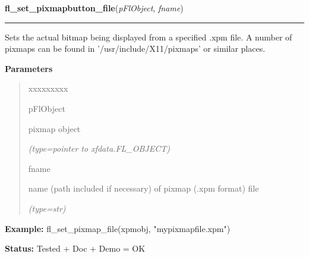     \vspace{0.5ex}

\hspace{.8\funcindent}\begin{boxedminipage}{\funcwidth}

    \raggedright \textbf{fl\_set\_pixmapbutton\_file}(\textit{pFlObject}, \textit{fname})

    \vspace{-1.5ex}

    \rule{\textwidth}{0.5\fboxrule}
\setlength{\parskip}{2ex}
    Sets the actual bitmap being displayed from a specified .xpm file. A 
    number of pixmaps can be found in '/usr/include/X11/pixmaps' or similar
    places.

\setlength{\parskip}{1ex}
      \textbf{Parameters}
      \vspace{-1ex}

      \begin{quote}
        \begin{Ventry}{xxxxxxxxx}

          \item[pFlObject]

          pixmap object

            {\it (type=pointer to xfdata.FL\_OBJECT)}

          \item[fname]

          name (path included if necessary) of pixmap (.xpm format) file

            {\it (type=str)}

        \end{Ventry}

      \end{quote}

\textbf{Example:} fl\_set\_pixmap\_file(xpmobj, "mypixmapfile.xpm")



\textbf{Status:} Tested + Doc + Demo = OK



    \end{boxedminipage}

    \label{xformslib:flbitmap:fl_set_pixmap_file}

    \vspace{0.5ex}

